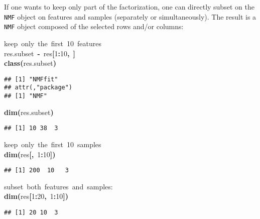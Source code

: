 \documentclass[a4paper]{article}\usepackage{graphicx, color}
\makeatletter
\newcommand{\hlnumber}[1]{\textcolor[rgb]{0,0,0}{#1}}%
\newcommand{\hlfunctioncall}[1]{\textcolor[rgb]{0.501960784313725,0,0.329411764705882}{\textbf{#1}}}%
\newcommand{\hlkeyword}[1]{\textcolor[rgb]{0,0,0}{\textbf{#1}}}%
\newcommand{\hlcomment}[1]{\textcolor[rgb]{0.180392156862745,0.6,0.341176470588235}{#1}}%
\newcommand{\hlassignement}[1]{\textcolor[rgb]{0,0,0}{\textbf{#1}}}%
\newcommand{\hlsymbol}[1]{\textcolor[rgb]{0,0,0}{#1}}%
\newcommand{\hlstd}[1]{\textcolor[rgb]{0,0,0}{#1}}%
\newenvironment{kframe}{%
 \def\FrameCommand##1{\hskip\@totalleftmargin \hskip-\fboxsep
 \colorbox{shadecolor}{##1}\hskip-\fboxsep
     \hskip-\linewidth \hskip-\@totalleftmargin \hskip\columnwidth}%
 \MakeFramed {\advance\hsize-\width
   \@totalleftmargin\z@ \linewidth\hsize
   \@setminipage}}%
 {\par\unskip\endMakeFramed}
\newenvironment{knitrout}{}{} %
\let\code=\texttt
\makeatother
\begin{document}
If one wants to keep only part of the factorization, one can directly subset on the \code{NMF} object on features and samples (separately or simultaneously).
The result is a \code{NMF} object composed of the selected rows and/or columns:
\begin{knitrout}
\color{fgcolor}\begin{kframe}
\begin{flushleft}
\ttfamily\noindent
\hlcomment{\usebox{\hlnormalsizeboxhash}{\ }keep{\ }only{\ }the{\ }first{\ }10{\ }features}\hspace*{\fill}\\
\hlstd{}\hlsymbol{res.subset}{\ }\hlassignement{\usebox{\hlnormalsizeboxlessthan}-}{\ }\hlsymbol{res}\hlkeyword{[}\hlnumber{1}\hlkeyword{:}\hlnumber{10}\hlkeyword{,}{\ }\hlkeyword{]}\hspace*{\fill}\\
\hlstd{}\hlfunctioncall{class}\hlkeyword{(}\hlsymbol{res.subset}\hlkeyword{)}\mbox{}
\normalfont
\end{flushleft}
\begin{verbatim}
## [1] "NMFfit"
## attr(,"package")
## [1] "NMF"
\end{verbatim}
\begin{flushleft}
\ttfamily\noindent
\hlfunctioncall{dim}\hlkeyword{(}\hlsymbol{res.subset}\hlkeyword{)}\mbox{}
\normalfont
\end{flushleft}
\begin{verbatim}
## [1] 10 38  3
\end{verbatim}
\begin{flushleft}
\ttfamily\noindent
\hlcomment{\usebox{\hlnormalsizeboxhash}{\ }keep{\ }only{\ }the{\ }first{\ }10{\ }samples}\hspace*{\fill}\\
\hlstd{}\hlfunctioncall{dim}\hlkeyword{(}\hlsymbol{res}\hlkeyword{[}\hlkeyword{,}{\ }\hlnumber{1}\hlkeyword{:}\hlnumber{10}\hlkeyword{]}\hlkeyword{)}\mbox{}
\normalfont
\end{flushleft}
\begin{verbatim}
## [1] 200  10   3
\end{verbatim}
\begin{flushleft}
\ttfamily\noindent
\hlcomment{\usebox{\hlnormalsizeboxhash}{\ }subset{\ }both{\ }features{\ }and{\ }samples:}\hspace*{\fill}\\
\hlstd{}\hlfunctioncall{dim}\hlkeyword{(}\hlsymbol{res}\hlkeyword{[}\hlnumber{1}\hlkeyword{:}\hlnumber{20}\hlkeyword{,}{\ }\hlnumber{1}\hlkeyword{:}\hlnumber{10}\hlkeyword{]}\hlkeyword{)}\mbox{}
\normalfont
\end{flushleft}
\begin{verbatim}
## [1] 20 10  3
\end{verbatim}
\end{kframe}
\end{knitrout}
\end{document}
